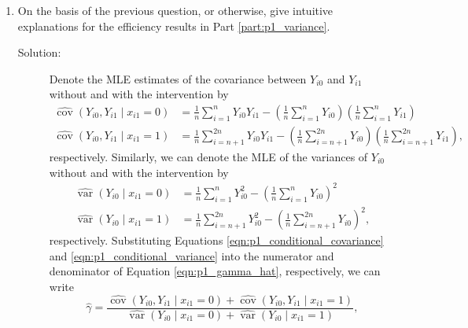 \documentclass[letterpaper,11pt]{article}
\begin{document}
\begin{enumerate}
\begin{enumerate}
\begin{description}
    \end{description}
  \item On the basis of the previous question, or otherwise, give intuitive
    explanations for the efficiency results in Part \ref{part:p1_variance}.
    \begin{description}
    \item[Solution:] Denote the MLE estimates of the covariance between $Y_{i0}$
      and $Y_{i1}$ without and with the intervention by
      \begin{align}
        \hat{\operatorname{cov}}\left(
        Y_{i0}, Y_{i1} \mid x_{i1} = 0
        \right)
        &= \frac{1}{n}\sum_{i=1}^{n} Y_{i0}Y_{i1}
        - \left(\frac{1}{n}\sum_{i=1}^{n} Y_{i0}\right)
          \left(\frac{1}{n}\sum_{i=1}^{n} Y_{i1}\right) \label{eqn:p1_conditional_covariance}\\
        \hat{\operatorname{cov}}\left(
        Y_{i0}, Y_{i1} \mid x_{i1} = 1
        \right)
        &= \frac{1}{n}\sum_{i=n+1}^{2n} Y_{i0}Y_{i1}
        - \left(\frac{1}{n}\sum_{i=n+1}^{2n} Y_{i0}\right)
          \left(\frac{1}{n}\sum_{i=n+1}^{2n} Y_{i1}\right),
          \nonumber
      \end{align}
      respectively. Similarly, we can denote the MLE of the variances of
      $Y_{i0}$ without and with the intervention by
      \begin{align}
        \hat{\operatorname{var}}\left(Y_{i0} \mid x_{i1} = 0\right)
        &= \frac{1}{n}\sum_{i=1}^n Y_{i0}^2 - \left(\frac{1}{n}\sum_{i=1}^n Y_{i0}\right)^2
        \label{eqn:p1_conditional_variance}\\
        \hat{\operatorname{var}}\left(Y_{i0} \mid x_{i1} = 1\right)
        &= \frac{1}{n}\sum_{i=n+1}^{2n} Y_{i0}^2 -
          \left(\frac{1}{n}\sum_{i=n+1}^{2n} Y_{i0}\right)^2,
          \nonumber
      \end{align}
      respectively. Substituting Equations \ref{eqn:p1_conditional_covariance}
      and \ref{eqn:p1_conditional_variance} into the numerator and denominator
      of Equation \ref{eqn:p1_gamma_hat}, respectively, we can write
      \begin{equation}
        \hat{\gamma} = 
        \frac{\hat{\operatorname{cov}}\left(Y_{i0}, Y_{i1} \mid x_{i1} = 0\right) +
          \hat{\operatorname{cov}}\left(Y_{i0}, Y_{i1} \mid x_{i1} = 1\right)}
        {\hat{\operatorname{var}}\left(Y_{i0} \mid x_{i1} = 0\right) +
          \hat{\operatorname{var}}\left(Y_{i0} \mid x_{i1} = 1\right)},
        \label{eqn:p1_gamma_hat_variance}
      \end{equation}

\end{description}
\end{enumerate}
\end{enumerate}
\end{document}
